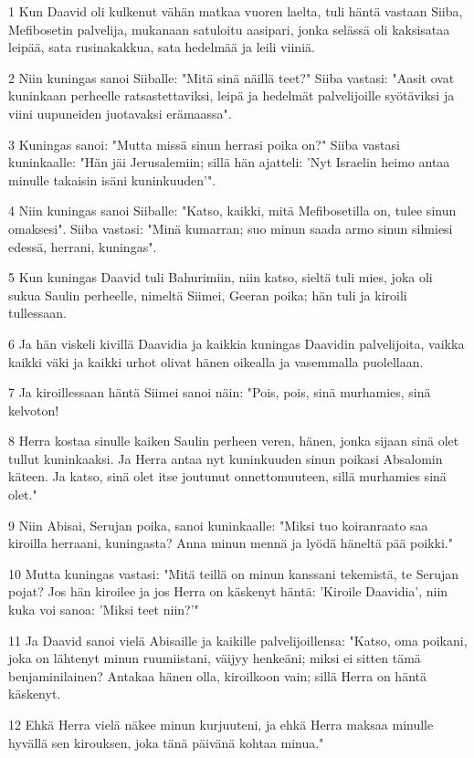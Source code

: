 \par 1 Kun Daavid oli kulkenut vähän matkaa vuoren laelta, tuli häntä vastaan Siiba, Mefibosetin palvelija, mukanaan satuloitu aasipari, jonka selässä oli kaksisataa leipää, sata rusinakakkua, sata hedelmää ja leili viiniä.
\par 2 Niin kuningas sanoi Siiballe: "Mitä sinä näillä teet?" Siiba vastasi: "Aasit ovat kuninkaan perheelle ratsastettaviksi, leipä ja hedelmät palvelijoille syötäviksi ja viini uupuneiden juotavaksi erämaassa".
\par 3 Kuningas sanoi: "Mutta missä sinun herrasi poika on?" Siiba vastasi kuninkaalle: "Hän jäi Jerusalemiin; sillä hän ajatteli: 'Nyt Israelin heimo antaa minulle takaisin isäni kuninkuuden'".
\par 4 Niin kuningas sanoi Siiballe: "Katso, kaikki, mitä Mefibosetilla on, tulee sinun omaksesi". Siiba vastasi: "Minä kumarran; suo minun saada armo sinun silmiesi edessä, herrani, kuningas".
\par 5 Kun kuningas Daavid tuli Bahurimiin, niin katso, sieltä tuli mies, joka oli sukua Saulin perheelle, nimeltä Siimei, Geeran poika; hän tuli ja kiroili tullessaan.
\par 6 Ja hän viskeli kivillä Daavidia ja kaikkia kuningas Daavidin palvelijoita, vaikka kaikki väki ja kaikki urhot olivat hänen oikealla ja vasemmalla puolellaan.
\par 7 Ja kiroillessaan häntä Siimei sanoi näin: "Pois, pois, sinä murhamies, sinä kelvoton!
\par 8 Herra kostaa sinulle kaiken Saulin perheen veren, hänen, jonka sijaan sinä olet tullut kuninkaaksi. Ja Herra antaa nyt kuninkuuden sinun poikasi Absalomin käteen. Ja katso, sinä olet itse joutunut onnettomuuteen, sillä murhamies sinä olet."
\par 9 Niin Abisai, Serujan poika, sanoi kuninkaalle: "Miksi tuo koiranraato saa kiroilla herraani, kuningasta? Anna minun mennä ja lyödä häneltä pää poikki."
\par 10 Mutta kuningas vastasi: "Mitä teillä on minun kanssani tekemistä, te Serujan pojat? Jos hän kiroilee ja jos Herra on käskenyt häntä: 'Kiroile Daavidia', niin kuka voi sanoa: 'Miksi teet niin?'"
\par 11 Ja Daavid sanoi vielä Abisaille ja kaikille palvelijoillensa: "Katso, oma poikani, joka on lähtenyt minun ruumiistani, väijyy henkeäni; miksi ei sitten tämä benjaminilainen? Antakaa hänen olla, kiroilkoon vain; sillä Herra on häntä käskenyt.
\par 12 Ehkä Herra vielä näkee minun kurjuuteni, ja ehkä Herra maksaa minulle hyvällä sen kirouksen, joka tänä päivänä kohtaa minua."
